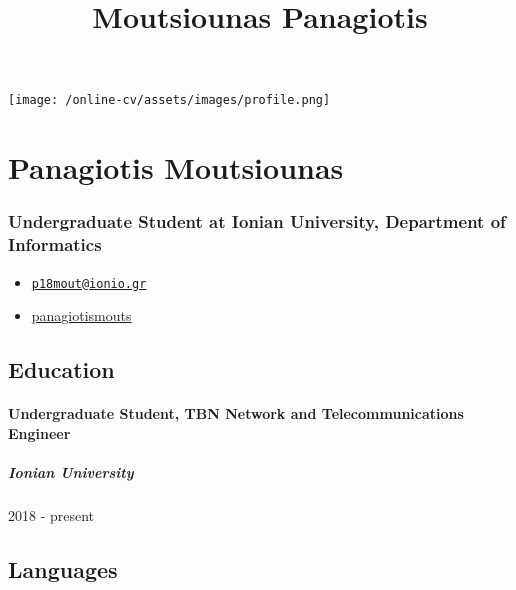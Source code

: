 \documentclass[english,]{article}
\title{Moutsiounas Panagiotis}
\date{}
\providecommand{\tightlist}{%
  \setlength{\itemsep}{0pt}\setlength{\parskip}{0pt}}
\let\oldsubparagraph\subparagraph
\renewcommand{\subparagraph}[1]{\oldsubparagraph{#1}\mbox{}}
\begin{document}
\maketitle

\texttt{[image: /online-cv/assets/images/profile.png]}

\hypertarget{panagiotis-moutsiounas}{%
\section{Panagiotis Moutsiounas}\label{panagiotis-moutsiounas}}

\hypertarget{undergraduate-student-at-ionian-university-department-of-informatics}{%
\subsubsection{Undergraduate Student at Ionian University, Department of
Informatics}\label{undergraduate-student-at-ionian-university-department-of-informatics}}

\begin{itemize}
\tightlist
\item
  \emph{} \href{mailto:p18mout@ionio.gr}{\nolinkurl{p18mout@ionio.gr}}
\item
  \emph{} \href{http://github.com/panagiotismouts}{panagiotismouts}
\end{itemize}

\hypertarget{education}{%
\subsection{Education}\label{education}}

\hypertarget{undergraduate-student-tbn-network-and-telecommunications-engineer}{%
\paragraph{Undergraduate Student, TBN Network and Telecommunications
Engineer}\label{undergraduate-student-tbn-network-and-telecommunications-engineer}}

\hypertarget{ionian-university}{%
\subparagraph{Ionian University}\label{ionian-university}}

2018 - present

\hypertarget{languages}{%
\subsection{Languages}\label{languages}}
\end{document}
